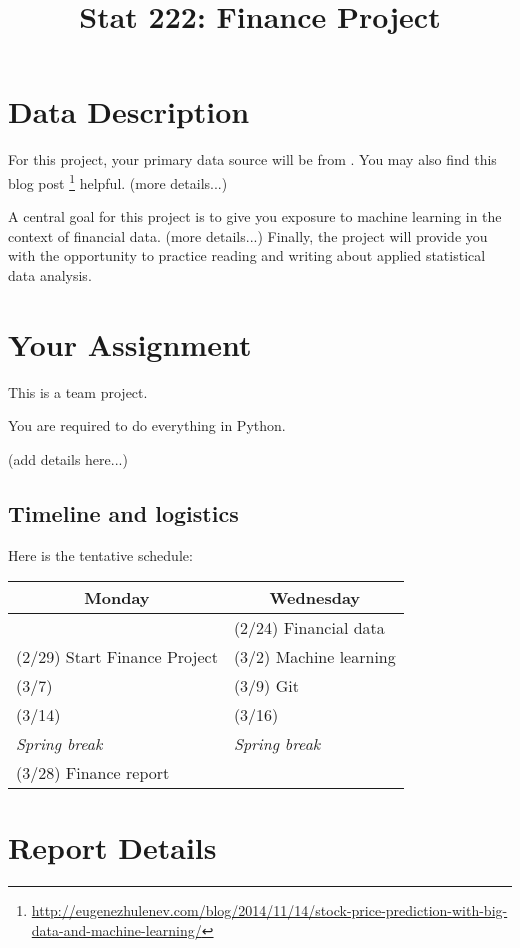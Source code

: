 \documentclass[11pt, oneside]{article}   	%
\title{Stat 222: Finance Project}
\date{}							%
\begin{document}
\maketitle

\section{Data Description}

For this project, your primary data source will be from 
\cite{kercheval2015modelling}.
You may also find this blog
post \footnote{\url{http://eugenezhulenev.com/blog/2014/11/14/stock-price-prediction-with-big-data-and-machine-learning/}}
helpful.
(more details...)

A central goal for this project is to give you exposure to machine learning
in the context of financial data.
(more details...)
Finally, the project will provide you
with the opportunity to practice reading and writing about applied statistical
data analysis.


\section{Your Assignment}

This is a team project.

You are required to do everything in Python.

(add details here...)

\subsection*{Timeline and logistics}

Here is the tentative schedule:

\begin{table}[h]
\centering
\begin{tabular}{@{}l|l@{}}
\toprule
\multicolumn{1}{c|}{Monday} & \multicolumn{1}{c}{Wednesday} \\
\hline
                               & (2/24) Financial data \\
(2/29) Start Finance Project   & (3/2) Machine learning \\
(3/7)                          & (3/9) Git \\
(3/14)                         & (3/16) \\
\emph{\hspace{12mm} Spring break}  & \emph{\hspace{12mm} Spring break}\\
(3/28) Finance report          & \\
\bottomrule
\end{tabular}
\end{table}


\section{Report Details}




\end{document}
